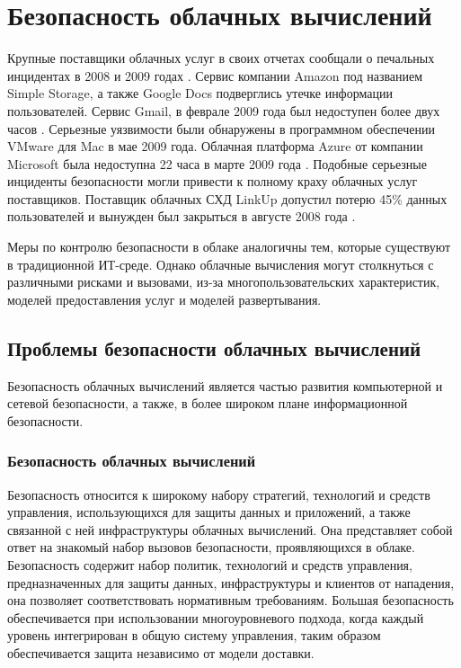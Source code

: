 \section{Безопасность облачных вычислений}

Крупные поставщики облачных услуг в своих отчетах сообщали о печальных инцидентах в 2008 и 2009 годах \cite{amazon}.
Сервис компании Amazon под названием Simple Storage, а также Google Docs подверглись утечке информации пользователей.
Сервис Gmail, в феврале 2009 года был недоступен более двух часов \cite{gmail}.
Серьезные уязвимости были обнаружены в программном обеспечении VMware для Mac в мае 2009 года.
Облачная платформа Azure от компании Microsoft была недоступна 22 часа в марте 2009 года \cite{azure}.
Подобные серьезные инциденты безопасности могли привести к полному краху облачных услуг поставщиков.
Поставщик облачных СХД LinkUp допустил потерю 45\% данных пользователей и вынужден был закрыться в августе 2008 года \cite{linkup}.

Меры по контролю безопасности в облаке аналогичны тем, которые существуют в традиционной ИТ-среде.
Однако облачные вычисления могут столкнуться с различными рисками и вызовами, из-за многопользовательских характеристик, моделей предоставления услуг и моделей развертывания.

\subsection{Проблемы безопасности облачных вычислений}

Безопасность облачных вычислений является частью развития компьютерной и сетевой безопасности, а также, в более широком плане информационной безопасности.

\subsubsection{Безопасность облачных вычислений}

Безопасность относится к широкому набору стратегий, технологий и средств управления, использующихся для защиты данных и приложений, а также связанной с ней инфраструктуры облачных вычислений.
Она представляет собой ответ на знакомый набор вызовов безопасности, проявляющихся в облаке.
Безопасность содержит набор политик, технологий и средств управления, предназначенных для защиты данных, инфраструктуры и клиентов от нападения, она позволяет соответствовать нормативным требованиям.
Большая безопасность обеспечивается при использовании многоуровневого подхода, когда каждый уровень интегрирован в общую систему управления, таким образом обеспечивается защита независимо от модели доставки.

